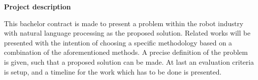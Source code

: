 \textbf{\Large{Project description}}

This bachelor contract is made to present a problem within the robot 
industry with natural language processing as the proposed 
solution. Related works will be presented with 
the intention of choosing a specific methodology based on a combination 
of the aforementioned methods. A precise definition of the problem is 
given, such that a proposed solution can be made. At last an evaluation 
criteria is setup, and a timeline for the work which has to be done 
is presented.

